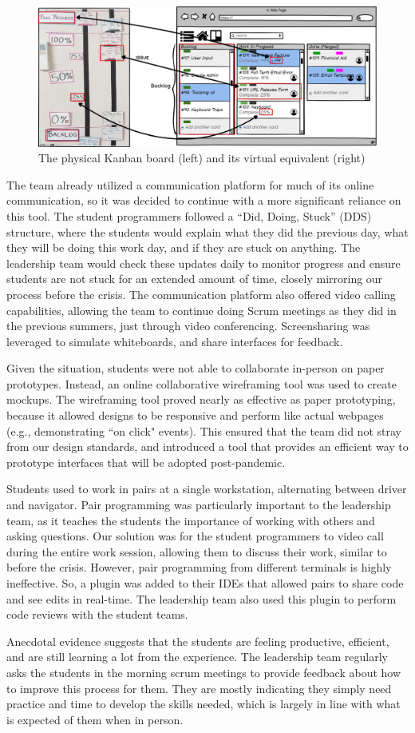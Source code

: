 \begin{figure}[h]
 \centering
 \includegraphics[width=0.8\linewidth]{newTrellomockup2.png}
 \caption{The physical Kanban board (left) and its virtual equivalent (right)}
 \label{fig:digitalkanban}
\end{figure}

The team already utilized a communication platform for much of its online communication, so it was decided to continue with a more significant reliance on this tool. The student programmers followed a ``Did, Doing, Stuck'' (DDS) structure, where the students would explain what they did the previous day, what they will be doing this work day, and if they are stuck on anything. The leadership team would check these updates daily to monitor progress and ensure students are not stuck for an extended amount of time, closely mirroring our process before the crisis. The communication platform also offered video calling capabilities, allowing the team to continue doing Scrum meetings as they did in the previous summers, just through video conferencing. Screensharing was leveraged to simulate whiteboards, and share interfaces for feedback.

Given the situation, students were not able to collaborate in-person on paper prototypes. Instead, an online collaborative wireframing tool was used to create mockups. The wireframing tool proved nearly as effective as paper prototyping, because it allowed designs to be responsive and perform like actual webpages (e.g., demonstrating ``on click" events). This ensured that the team did not stray from our design standards, and introduced a tool that provides an efficient way to prototype interfaces that will be adopted post-pandemic.

Students used to work in pairs at a single workstation, alternating between driver and navigator. Pair programming was particularly important to the leadership team, as it teaches the students the importance of working with others and asking questions. Our solution was for the student programmers to video call during the entire work session, allowing them to discuss their work, similar to before the crisis. However, pair programming from different terminals is highly ineffective. So, a plugin was added to their IDEs that allowed pairs to share code and see edits in real-time. The leadership team also used this plugin to perform code reviews with the student teams.

Anecdotal evidence suggests that the students are feeling productive, efficient, and are still learning a lot from the experience. The leadership team regularly asks the students in the morning scrum meetings to provide feedback about how to improve this process for them. They are mostly indicating they simply need practice and time to develop the skills needed, which is largely in line with what is expected of them when in person.
